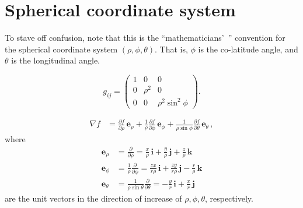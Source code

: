 \documentclass[12pt]{article}
\newcommand{\vi}{\mathbf{i}}
\newcommand{\vj}{\mathbf{j}}
\newcommand{\vk}{\mathbf{k}}
\newcommand{\ve}{\mathbf{e}}
\begin{document}
\section{Spherical coordinate system}
To stave off confusion, note that this is the ``mathematicians'~'' convention for the spherical coordinate
system $(\rho,\phi,\theta)$.
That is, $\phi$ is the co-latitude angle, and $\theta$ is the longitudinal angle.

\[
g_{ij} =
\begin{pmatrix}
1&0&0 \\ 0&\rho^2&0\\ 0&0&\rho^2\sin^2\phi
\end{pmatrix}.
\]

\begin{align*}
\nabla f &= 
\frac{\partial f}{\partial\rho}\,\ve_\rho +
\frac{1}{\rho}\frac{\partial f}{\partial\phi}\,\ve_\phi +
\frac{1}{\rho\sin\phi}\frac{\partial f}{\partial\theta}\,\ve_\theta\,,
\end{align*}
where
\begin{align*}
\ve_\rho &= \frac{\partial}{\partial \rho} =
\frac{x}{\rho}\, \vi + \frac{y}{\rho}\, \vj + \frac{z}{\rho}\, \vk\\
\ve_\phi &= \frac{1}{\rho} \frac{\partial}{\partial \phi} = \frac{z
x}{r\rho} \, \vi +
\frac{ zy}{r\rho}\, \vj - \frac{r}{\rho}\, \vk\\
\ve_\theta &= \frac{1}{\rho\sin\theta}\frac{\partial}{\partial
\theta} = - \frac{y}{r}\, \vi +
\frac{x}{r}\, \vj
\end{align*}
are the unit vectors in the direction of increase of $\rho, \phi, \theta$, respectively.
\end{document}
